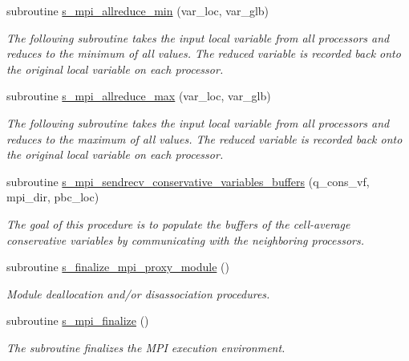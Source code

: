 \begin{DoxyCompactItemize}
subroutine \hyperlink{namespacem__mpi__proxy_a398a372625502c0430a64e0bb23e2342}{s\+\_\+mpi\+\_\+allreduce\+\_\+min} (var\+\_\+loc, var\+\_\+glb)
\begin{DoxyCompactList}\small\item\em The following subroutine takes the input local variable from all processors and reduces to the minimum of all values. The reduced variable is recorded back onto the original local variable on each processor. \end{DoxyCompactList}\item 
subroutine \hyperlink{namespacem__mpi__proxy_aff7286de058c49b2a5d7a84be1983e8f}{s\+\_\+mpi\+\_\+allreduce\+\_\+max} (var\+\_\+loc, var\+\_\+glb)
\begin{DoxyCompactList}\small\item\em The following subroutine takes the input local variable from all processors and reduces to the maximum of all values. The reduced variable is recorded back onto the original local variable on each processor. \end{DoxyCompactList}\item 
subroutine \hyperlink{namespacem__mpi__proxy_a9015d32f3d27c21a75e8a916e5090b96}{s\+\_\+mpi\+\_\+sendrecv\+\_\+conservative\+\_\+variables\+\_\+buffers} (q\+\_\+cons\+\_\+vf, mpi\+\_\+dir, pbc\+\_\+loc)
\begin{DoxyCompactList}\small\item\em The goal of this procedure is to populate the buffers of the cell-\/average conservative variables by communicating with the neighboring processors. \end{DoxyCompactList}\item 
subroutine \hyperlink{namespacem__mpi__proxy_ac984c84fe4140876d6600250af9807da}{s\+\_\+finalize\+\_\+mpi\+\_\+proxy\+\_\+module} ()
\begin{DoxyCompactList}\small\item\em Module deallocation and/or disassociation procedures. \end{DoxyCompactList}\item 
subroutine \hyperlink{namespacem__mpi__proxy_a43fbda10c02ec8bc1fc572c83090f2e5}{s\+\_\+mpi\+\_\+finalize} ()
\begin{DoxyCompactList}\small\item\em The subroutine finalizes the M\+PI execution environment. \end{DoxyCompactList}\end{DoxyCompactItemize}
